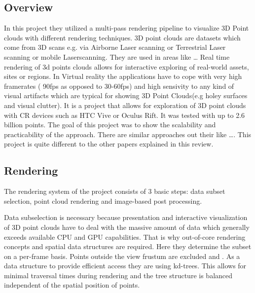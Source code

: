 \documentclass[10pt,twocolumn,letterpaper]{article}
\begin{document}
\subsection{Overview}
In this project \cite{discher_point-based_2018} they utilized a multi-pass rendering pipeline to visualize 3D Point clouds with different rendering techniques. 3D point clouds are datasets which come from 3D scans e.g. via Airborne Laser scanning or Terrestrial Laser scanning or mobile Laserscanning. They are used in areas like …
Real time rendering of 3d points clouds allows for interactive exploring of real-world assets, sites or regions. In Virtual reality the applications have to cope with very high framerates ( 90fps as opposed to 30-60fps) and high sensivity to any kind of visual artifacts which are typical for showing 3D Point Clouds(e.g holey surfaces and visual clutter). It is a project that allows for exploration of 3D point clouds with CR devices such as HTC Vive or Oculus Rift. It was tested with up to 2.6 billion points. The goal of this project was to show the scalability and practicability of the approach.
There are similar approaches out their like ….
This project is quite different to the other papers explained in this review.

\subsection{Rendering}
The rendering system of the project consists of 3 basic steps: data subset selection, point cloud rendering and image-based post processing.

\setlength{\parindent}{1pc}Data subselection is necessary because presentation and interactive visualization of 3D point clouds have to deal with the massive amount of data which generally exceeds available CPU and GPU capabilities. That is why out-of-core rendering concepts and spatial data structures are required. Here they determine the subset on a per-frame basis. Points outside the view frustum are excluded and . As a data structure to provide efficient access they are using kd-trees. This allows for minimal traversal times during rendering and the tree structure is balanced independent of the spatial position of points.
\end{document}
